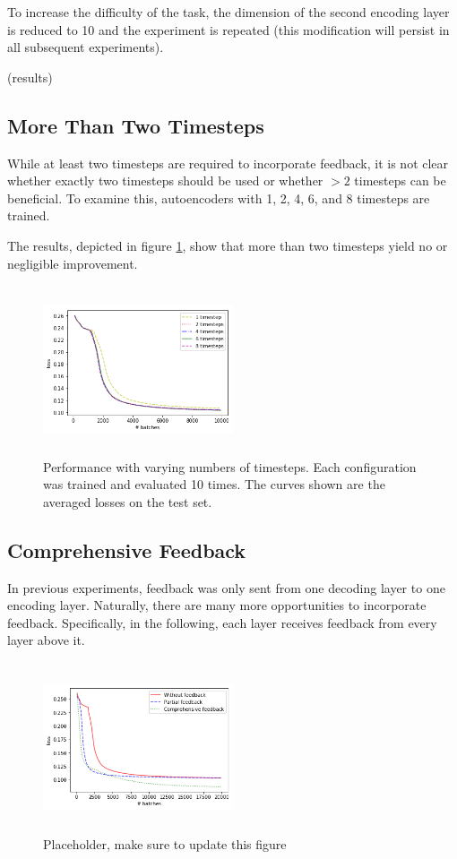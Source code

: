\documentclass{article}
\begin{document}
To increase the difficulty of the task, the dimension of the second encoding layer is reduced to 10 and the experiment is repeated (this modification will persist in all subsequent experiments).

(results) 

\subsection{More Than Two Timesteps}
\label{timesteps}
While at least two timesteps are required to incorporate feedback, it is not clear whether exactly two timesteps should be used or whether $>2$ timesteps can be beneficial. To examine this, autoencoders with 1, 2, 4, 6, and 8 timesteps are trained. 

The results, depicted in figure \ref{fig:timesteps}, show that more than two timesteps yield no or negligible improvement. 


\begin{figure}
      \centering
      \includegraphics[width=0.5\textwidth,height=5cm,keepaspectratio]{img/timesteps_test.png}
      \caption{Performance with varying numbers of timesteps. Each configuration was trained and evaluated 10 times. The curves shown are the averaged losses on the test set.}
      \label{fig:timesteps}
  \end{figure}
 
 
\subsection{Comprehensive Feedback}
In previous experiments, feedback was only sent from one decoding layer to one encoding layer. Naturally, there are many more opportunities to incorporate feedback. Specifically, in the following, each layer receives feedback from every layer above it.

  \begin{figure}
      \centering
      \includegraphics[width=0.5\textwidth,height=5cm,keepaspectratio]{img/fullfb.png}
      \caption{Placeholder, make sure to update this figure}
      \label{fig:fullfeedback}
  \end{figure}
  
\end{document}
